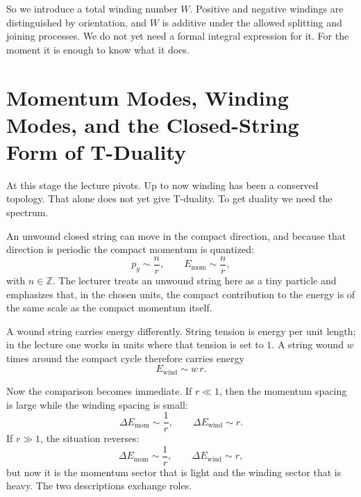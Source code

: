 So we introduce a total winding number \(W\). Positive and negative windings are distinguished by orientation, and \(W\) is additive under the allowed splitting and joining processes. We do not yet need a formal integral expression for it. For the moment it is enough to know what it does.

\section{Momentum Modes, Winding Modes, and the Closed-String Form of T-Duality}

At this stage the lecture pivots. Up to now winding has been a conserved topology. That alone does not yet give T-duality. To get duality we need the spectrum.

An unwound closed string can move in the compact direction, and because that direction is periodic the compact momentum is quantized:
\begin{equation}
p_y \sim \frac{n}{r}, \qquad E_{\text{mom}} \sim \frac{n}{r},
\end{equation}
with \(n\in\mathbb{Z}\). The lecturer treats an unwound string here as a tiny particle and emphasizes that, in the chosen units, the compact contribution to the energy is of the same scale as the compact momentum itself.

A wound string carries energy differently. String tension is energy per unit length; in the lecture one works in units where that tension is set to \(1\). A string wound \(w\) times around the compact cycle therefore carries energy
\begin{equation}
E_{\text{wind}} \sim w\,r.
\end{equation}

Now the comparison becomes immediate. If \(r\ll 1\), then the momentum spacing is large while the winding spacing is small:
\begin{equation}
\Delta E_{\text{mom}} \sim \frac{1}{r}, \qquad
\Delta E_{\text{wind}} \sim r.
\end{equation}
If \(r\gg 1\), the situation reverses:
\begin{equation}
\Delta E_{\text{mom}} \sim \frac{1}{r}, \qquad
\Delta E_{\text{wind}} \sim r,
\end{equation}
but now it is the momentum sector that is light and the winding sector that is heavy. The two descriptions exchange roles.


